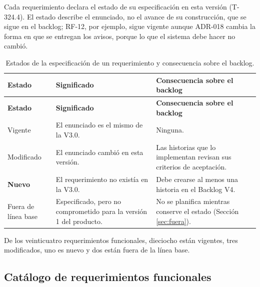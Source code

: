 \documentclass[11pt,a4paper]{article}
\newcommand{\rvig}{Vigente}
\newcommand{\rmod}{\textcolor{vinoclaro}{Modificado}}
\newcommand{\rnue}{\textcolor{vinotinto}{\textbf{Nuevo}}}
\newcommand{\rflb}{\textcolor{grisTexto}{Fuera de línea base}}
\begin{document}
Cada requerimiento declara el estado de su especificación en esta versión (T-324.4). El estado describe el enunciado, no el avance de su construcción, que se sigue en el backlog; RF-12, por ejemplo, sigue vigente aunque ADR-018 cambia la forma en que se entregan los avisos, porque lo que el sistema debe hacer no cambió.

\begin{longtable}{L{2.6cm} L{6.4cm} L{5.6cm}}
\caption{Estados de la especificación de un requerimiento y consecuencia sobre el backlog.}\label{tab:estados}\\
\toprule
\textbf{Estado} & \textbf{Significado} & \textbf{Consecuencia sobre el backlog} \\
\midrule
\endfirsthead
\toprule
\textbf{Estado} & \textbf{Significado} & \textbf{Consecuencia sobre el backlog} \\
\midrule
\endhead
\bottomrule
\endlastfoot
\rvig & El enunciado es el mismo de la V3.0. & Ninguna. \\
\rmod & El enunciado cambió en esta versión. & Las historias que lo implementan revisan sus criterios de aceptación. \\
\rnue & El requerimiento no existía en la V3.0. & Debe crearse al menos una historia en el Backlog V4. \\
\rflb & Especificado, pero no comprometido para la versión 1 del producto. & No se planifica mientras conserve el estado (Sección \ref{sec:fuera}). \\
\end{longtable}

\vspace{0.2cm}
\noindent De los veinticuatro requerimientos funcionales, dieciocho están vigentes, tres modificados, uno es nuevo y dos están fuera de la línea base.

\subsection{Catálogo de requerimientos funcionales}
\end{document}
